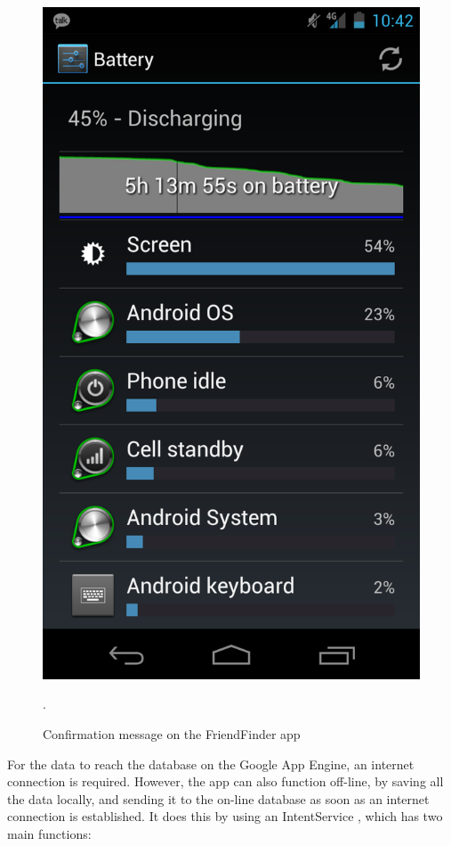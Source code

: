 \begin{figure}[h]
	\begin{center}
		\includegraphics[scale=0.2]{figures/galaxy-nexus-battery.png}
	\end{center}
	
	\caption{Confirmation message on the FriendFinder app}.
	\label{pic:ff_conf}

\end{figure}

For the data to reach the database on the Google App Engine, an internet connection is required. However, the app can also function off-line, by saving all the data locally, and sending it to the on-line database as soon as an internet connection is established. It does this by using an IntentService \cite{intentservice}, which has two main functions:

